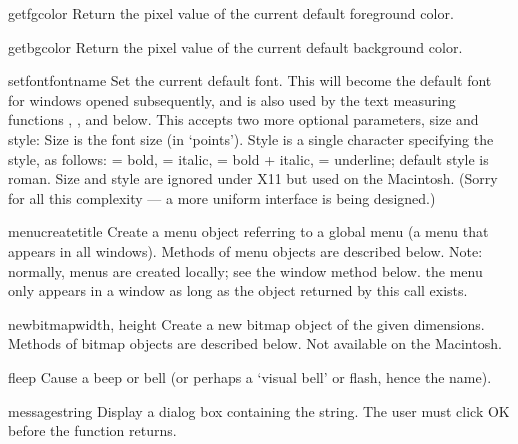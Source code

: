 \begin{funcdesc}{getfgcolor}{}
Return the pixel value of the current default foreground color.
\end{funcdesc}

\begin{funcdesc}{getbgcolor}{}
Return the pixel value of the current default background color.
\end{funcdesc}

\begin{funcdesc}{setfont}{fontname}
Set the current default font.
This will become the default font for windows opened subsequently,
and is also used by the text measuring functions ,
,  and
 below.  This accepts two more optional
parameters, size and style:  Size is the font size (in `points').
Style is a single character specifying the style, as follows:
 = bold,
 = italic,
 = bold + italic,
 = underline;
default style is roman.
Size and style are ignored under X11 but used on the Macintosh.
(Sorry for all this complexity --- a more uniform interface is being designed.)
\end{funcdesc}

\begin{funcdesc}{menucreate}{title}
Create a menu object referring to a global menu (a menu that appears in
all windows).
Methods of menu objects are described below.
Note: normally, menus are created locally; see the window method
 below.
 the menu only appears in a window as long as the object
returned by this call exists.
\end{funcdesc}

\begin{funcdesc}{newbitmap}{width, height}
Create a new bitmap object of the given dimensions.
Methods of bitmap objects are described below.
Not available on the Macintosh.
\end{funcdesc}

\begin{funcdesc}{fleep}{}
Cause a beep or bell (or perhaps a `visual bell' or flash, hence the
name).
\end{funcdesc}

\begin{funcdesc}{message}{string}
Display a dialog box containing the string.
The user must click OK before the function returns.
\end{funcdesc}

